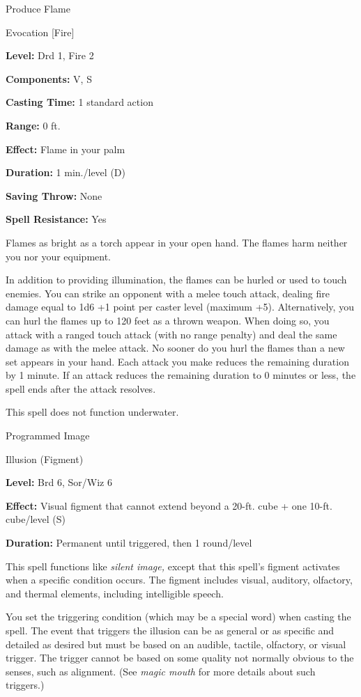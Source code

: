 \documentclass{article}
\begin{document}
\vspace{12pt}
Produce Flame

Evocation [Fire]

\textbf{Level:} Drd 1, Fire 2

\textbf{Components:} V, S

\textbf{Casting Time:} 1 standard action

\textbf{Range:} 0 ft.

\textbf{Effect:} Flame in your palm

\textbf{Duration:} 1 min./level (D)

\textbf{Saving Throw:} None

\textbf{Spell Resistance:} Yes

Flames as bright as a torch appear in your open hand. The flames harm neither you 
nor your equipment.

In addition to providing illumination, the flames can be hurled or used to touch 
enemies. You can strike an opponent with a melee touch attack, dealing fire damage 
equal to 1d6 +1 point per caster level (maximum +5). Alternatively, you can hurl 
the flames up to 120 feet as a thrown weapon. When doing so, you attack with a 
ranged touch attack (with no range penalty) and deal the same damage as with the 
melee attack. No sooner do you hurl the flames than a new set appears in your hand. 
Each attack you make reduces the remaining duration by 1 minute. If an attack reduces 
the remaining duration to 0 minutes or less, the spell ends after the attack resolves.

This spell does not function underwater.

\vspace{12pt}
Programmed Image

Illusion (Figment)

\textbf{Level:} Brd 6, Sor/Wiz 6

\textbf{Effect:} Visual figment that cannot extend beyond a 20-ft. cube + one 10-ft. 
cube/level (S)

\textbf{Duration:} Permanent until triggered, then 1 round/level

This spell functions like \textit{silent image, }except that this spell's figment 
activates when a specific condition occurs. The figment includes visual, auditory, 
olfactory, and thermal elements, including intelligible speech.

You set the triggering condition (which may be a special word) when casting the 
spell. The event that triggers the illusion can be as general or as specific and 
detailed as desired but must be based on an audible, tactile, olfactory, or visual 
trigger. The trigger cannot be based on some quality not normally obvious to the 
senses, such as alignment. (See \textit{magic mouth }for more details about such 
triggers.)
\end{document}
